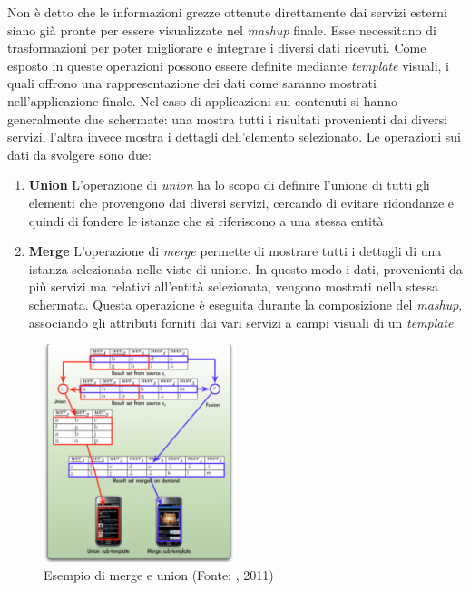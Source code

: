 Non è detto che le informazioni grezze ottenute direttamente dai servizi esterni siano già pronte per essere visualizzate nel \emph{mashup} finale. Esse necessitano di trasformazioni per poter migliorare e integrare i diversi dati ricevuti. Come esposto in \cite{caio2011tesi} queste operazioni possono essere definite mediante \emph{template} visuali, i quali offrono una rappresentazione dei dati come saranno mostrati nell'applicazione finale. Nel caso di applicazioni sui contenuti si hanno generalmente due schermate: una mostra tutti i risultati provenienti dai diversi servizi, l'altra invece mostra i dettagli dell'elemento selezionato. Le operazioni sui dati da svolgere sono due:

\begin{enumerate}
	\item \textbf{Union}
	L'operazione di \emph{union} ha lo scopo di definire l'unione di tutti gli elementi che provengono dai diversi servizi, cercando di evitare ridondanze e quindi di fondere le istanze che si riferiscono a una stessa entità
	\item \textbf{Merge}
	L'operazione di \emph{merge} permette di mostrare tutti i dettagli di una istanza selezionata nelle viste di unione. In questo modo i dati, provenienti da più servizi ma relativi all'entità selezionata, vengono mostrati nella stessa schermata. Questa operazione è eseguita durante la composizione del \emph{mashup}, associando gli attributi forniti dai vari servizi a campi visuali di un \emph{template}
\end{enumerate}

\begin{figure}[ht]
	\centering
	\includegraphics[width=0.5\textwidth]{2-preliminari/Immagini/merge-union.png}
	\caption[Esempio di merge e union]{Esempio di merge e union (Fonte: \cite{caio2011tesi}, 2011)}\label{fig:merge-union}
\end{figure}

